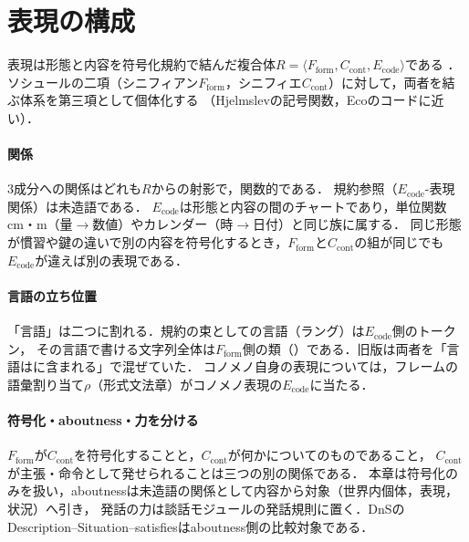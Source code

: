 \documentclass[../../main-detail.tex]{subfiles}
\begin{document}
\section{表現の構成}
表現は形態と内容を符号化規約で結んだ複合体$R=\langle F_{\mathrm{form}},C_{\mathrm{cont}},E_{\mathrm{code}}\rangle$である
\citep{yamato2022,mizoguchi-borgo2022representation,mizoguchi-borgo2025representation}．
ソシュールの二項（シニフィアン$F_{\mathrm{form}}$，シニフィエ$C_{\mathrm{cont}}$）に対して，両者を結ぶ体系を第三項として個体化する
（Hjelmslevの記号関数，Ecoのコードに近い）．

\paragraph{関係} 3成分への関係はどれも$R$からの射影で，関数的である．
規約参照（$E_{\mathrm{code}}$-表現関係）は未造語である．
$E_{\mathrm{code}}$は形態と内容の間のチャートであり，単位関数cm・m（量$\to$数値）やカレンダー（時$\to$日付）と同じ族に属する．
同じ形態が慣習や鍵の違いで別の内容を符号化するとき，$F_{\mathrm{form}}$と$C_{\mathrm{cont}}$の組が同じでも$E_{\mathrm{code}}$が違えば別の表現である．

\paragraph{言語の立ち位置} 「言語」は二つに割れる．規約の束としての言語（ラング）は$E_{\mathrm{code}}$側のトークン，
その言語で書ける文字列全体は$F_{\mathrm{form}}$側の類（）である．旧版は両者を「言語はに含まれる」で混ぜていた．
コノメノ自身の表現については，フレームの語彙割り当て$\rho$（形式文法章）がコノメノ表現の$E_{\mathrm{code}}$に当たる．

\paragraph{符号化・aboutness・力を分ける} $F_{\mathrm{form}}$が$C_{\mathrm{cont}}$を符号化することと，$C_{\mathrm{cont}}$が何かについてのものであること，
$C_{\mathrm{cont}}$が主張・命令として発せられることは三つの別の関係である．
本章は符号化のみを扱い，aboutnessは未造語の関係として内容から対象（世界内個体，表現，状況）へ引き，
発話の力は談話モジュールの発話規則に置く．DnSのDescription--Situation--satisfies\citep{gangemi-mika2003}はaboutness側の比較対象である．
\end{document}
